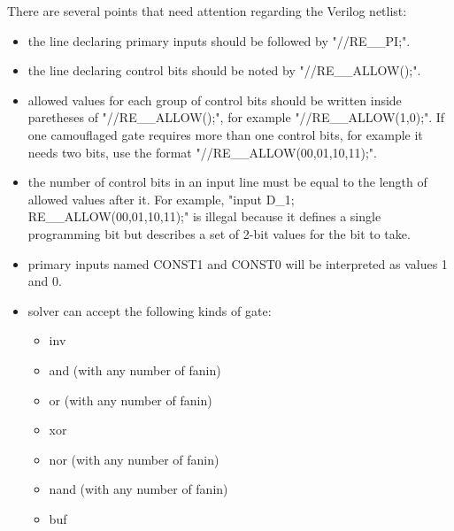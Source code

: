 \documentclass[proposal]{umassthesis}  %
\begin{document}
	There are several points that need attention regarding the Verilog netlist:
	\begin{itemize}

		\item the line declaring primary inputs should be followed by "\///RE\_\_PI;".
		\item the line declaring control bits should be noted by  "\///RE\_\_ALLOW();".
		\item allowed values for each group of control bits should be written inside paretheses of "\///RE\_\_ALLOW();", for example  "\///RE\_\_ALLOW(1,0);". If one camouflaged gate requires more than one control bits, for example it needs two bits, use the format  "\///RE\_\_ALLOW(00,01,10,11);".
		\item the number of control bits in an input line must be equal to the length of allowed values after it. For example, "input D\_1; RE\_\_ALLOW(00,01,10,11);" is illegal because it defines a single programming bit but describes a set of 2-bit values for the bit to take.
		\item primary inputs named CONST1 and CONST0 will be interpreted as values 1 and 0.
		\item solver can accept the following kinds of gate:
			\begin{itemize}
				\item inv
				\item and (with any number of fanin) 
				\item or (with any number of fanin)
				\item xor 
				\item nor (with any number of fanin)
				\item nand (with any number of fanin)
				\item buf
			\end{itemize}
	\end{itemize}
	\clearpage
\end{document}
